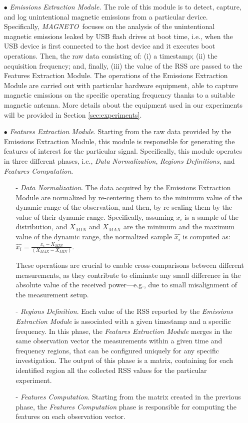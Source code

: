 \documentclass[acmsmall, authorversion]{acmart}
\newcommand{\sol}{\emph{MAGNETO}}
\begin{document}
\begin{itemize}
    \item[$\bullet$] \emph{Emissions Extraction Module.} The role of this module is to detect, capture, and log unintentional magnetic emissions from a particular device. Specifically, \sol\ focuses on the analysis of the unintentional magnetic emissions leaked by USB flash drives at boot time, i.e., when the USB device is first connected to the host device and it executes boot operations.  Then, the raw data consisting of: (i) a timestamp; (ii) the acquisition frequency; and, finally, (iii) the value of the \ac{RSS} are passed to the Features Extraction Module. 
    The operations of the Emissions Extraction Module are carried out with particular hardware equipment, able to capture magnetic emissions on the specific operating frequency thanks to a suitable magnetic antenna. More details about the equipment used in our experiments will be provided in Section \ref{sec:experiments}. 
    \item[$\bullet$] \emph{Features Extraction Module}. Starting from the raw data provided by the Emissions Extraction Module, this module is responsible for generating the features of interest for the particular signal. Specifically, this module operates in three different phases, i.e., \emph{Data Normalization}, \emph{Regions Definitions}, and \emph{Features Computation}.
    \begin{itemize}
        \item[-] \emph{Data Normalization}. The data acquired by the Emissions Extraction Module are normalized by re-centering them to the minimum value of the dynamic range of the observation, and then, by re-scaling them by the value of their dynamic range. Specifically, assuming $x_i$ is a sample of the distribution, and $X_{MIN}$ and $X_{MAX}$ are the minimum and the maximum value of the dynamic range, the normalized sample $\hat{x_i}$ is computed as: $\hat{x_i} = \frac{x_i - X_{MIN}}{ \left( X_{MAX} - X_{MIN} \right) } $. 
        
        These operations are crucial to enable cross-comparisons between different measurements, as they contribute to eliminate any small difference in the absolute value of the received power---e.g., due to small misalignment of the measurement setup.
        \item[-] \emph{Regions Definition}. Each value of the \ac{RSS} reported by the \emph{Emissions Extraction Module} is associated with a given timestamp and a specific frequency. In this phase, the \emph{Features Extraction Module} merges in the same observation vector the measurements within a given time and frequency regions, that can be configured uniquely for any specific investigation. The output of this phase is a matrix, containing for each identified region all the collected \ac{RSS} values for the particular experiment.
        \item[-] \emph{Features Computation}. Starting from the matrix created in the previous phase, the \emph{Features Computation} phase is responsible for computing the features on each observation vector.
        

\end{itemize}
\end{itemize}
\end{document}
